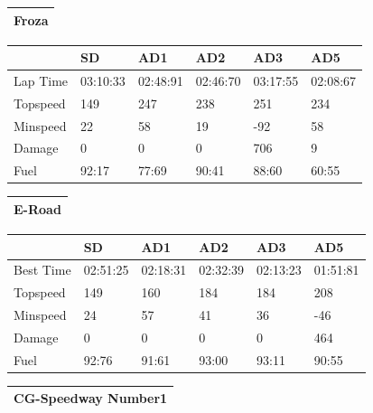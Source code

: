 \documentclass{llncs}
\begin{document}
\begin{table} [h!]
	\begin{tabular}{ |p{15.2cm}|}
		\hline
		\textbf{Froza}   
		\\
		\hline
	\end{tabular}
	\begin{tabular}{ |p{3cm}|p{2cm}|p{2cm}|p{2 cm}|p{2 cm}|p{2 cm}|}
		\hline
		&
		{ \color{red}\textbf{SD}}&  
		{ \color{red} \textbf{AD1} } &
		{ \color{red} \textbf{AD2} } &
		{ \color{red} \textbf{AD3} } &
		{ \color{red} \textbf{AD5} }
		\\
		\hline
		Lap Time &  03:10:33  & 02:48:91 & 02:46:70  & 03:17:55   & 02:08:67
		\\
		\hline
		Topspeed & 149 & 247 & 238 & 251 & 234 
		\\
		\hline
		Minspeed &  22 & 58 & 19 & -92 & 58
		\\
		\hline 
		Damage & 0 & 0 & 0 & 706 & 9
		\\
		\hline 
		Fuel & 92:17 & 77:69& 90:41& 88:60 & 60:55
		\\
		\hline 
	\end{tabular}
	\begin{tabular}{ |p{15.2cm}|}
		\hline
		\textbf{E-Road}   
		\\
		\hline
	\end{tabular}
	\begin{tabular}{ |p{3cm}|p{2cm}|p{2cm}|p{2 cm}|p{2 cm}|p{2 cm}|}
		\hline
		&
		{ \color{red}\textbf{SD}}&  
		{ \color{red} \textbf{AD1} } &
		{ \color{red} \textbf{AD2} } &
		{ \color{red} \textbf{AD3} } &
		{ \color{red} \textbf{AD5} }
		\\
		\hline
		Best Time &  02:51:25 & 02:18:31 & 02:32:39  &   02:13:23 & 01:51:81
		\\
		\hline
		Topspeed & 149  & 160 & 184 & 184  & 208
		\\
		\hline
		Minspeed & 24  & 57 &  41 & 36 &  -46
		\\
		\hline 
		
		Damage & 0 & 0 & 0 & 0 & 464 
		\\
		\hline 
		Fuel & 92:76 & 91:61  & 93:00  & 93:11& 90:55 
		\\
		\hline  
		
	\end{tabular}
	
	\begin{tabular}{ |p{15.2cm}|}
		\hline
		\textbf{CG-Speedway Number1}   
		\\
		\hline
	\end{tabular}
	

\end{table}
\end{document}
